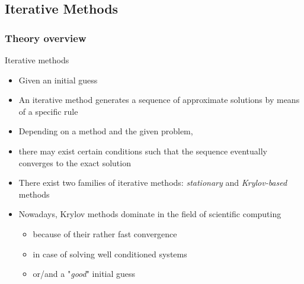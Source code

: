 \subsection{Iterative Methods}
\subsubsection{Theory overview}

\begin{frame}[t]{Iterative methods}
    \small
    
    \begin{itemize}
    	\item Given an initial guess
    	
    	\item An iterative method generates a sequence of approximate solutions by means of a specific rule
    	
    	\item Depending on a method and the given problem,
    	
    	\item there may exist certain conditions such that the sequence eventually converges to the exact solution
    	
    \end{itemize}

    \begin{itemize}
    	\item There exist two families of iterative methods: \textit{stationary} and \textit{Krylov-based} methods
    	
    	\item Nowadays, Krylov methods dominate in the field of scientific computing
    	
    	\begin{itemize}
    		\item because of their rather fast convergence
    		
    		\item in case of solving well conditioned systems
    		
    		\item or/and a "\textit{good}" initial guess
    	\end{itemize}
    \end{itemize}

\end{frame}


